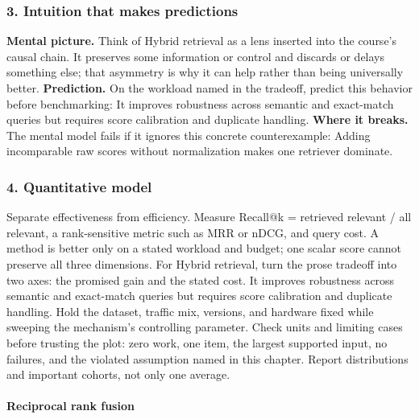 \subsubsection*{3. Intuition that makes predictions}
\textbf{Mental picture.} Think of Hybrid retrieval as a lens inserted into the course's causal chain. It preserves some information or control and discards or delays something else; that asymmetry is why it can help rather than being universally better.
\textbf{Prediction.} On the workload named in the tradeoff, predict this behavior before benchmarking: It improves robustness across semantic and exact-match queries but requires score calibration and duplicate handling.
\textbf{Where it breaks.} The mental model fails if it ignores this concrete counterexample: Adding incomparable raw scores without normalization makes one retriever dominate.
\subsubsection*{4. Quantitative model}
Separate effectiveness from efficiency. Measure Recall@k = retrieved relevant / all relevant, a rank-sensitive metric such as MRR or nDCG, and query cost. A method is better only on a stated workload and budget; one scalar score cannot preserve all three dimensions.
For Hybrid retrieval, turn the prose tradeoff into two axes: the promised gain and the stated cost. It improves robustness across semantic and exact-match queries but requires score calibration and duplicate handling. Hold the dataset, traffic mix, versions, and hardware fixed while sweeping the mechanism's controlling parameter.
Check units and limiting cases before trusting the plot: zero work, one item, the largest supported input, no failures, and the violated assumption named in this chapter. Report distributions and important cohorts, not only one average.
\paragraph{Reciprocal rank fusion}
